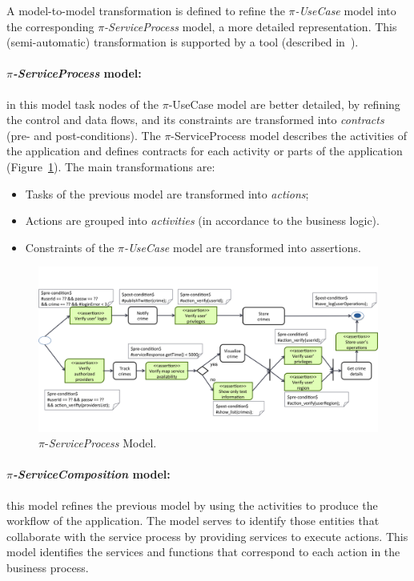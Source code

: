 \documentclass{llncs}
\theoremstyle{plain}
\theoremstyle{plain}
\theoremstyle{plain}
\begin{document}
A model-to-model transformation is defined to refine the \textit{$\pi$-UseCase} model into the
corresponding \textit{$\pi$-ServiceProcess} model, a more detailed representation. 
This (semi-automatic) transformation  is supported by a tool (described in~\cite{PlacidoThesis2012}).


\paragraph*{\textit{$\pi$-ServiceProcess} model:}
in this model task nodes of the $\pi$-UseCase model are better detailed, by refining the control and data flows, and its constraints are transformed into \textit{contracts} (pre- and post-conditions).
The $\pi$-ServiceProcess model describes the activities of the application and defines contracts for each activity or parts of the application (Figure~\ref{fig:piSP}). The main transformations are: 
\begin{itemize}
\item Tasks of the previous model are transformed into \textit{actions};
\item Actions are grouped into \textit{activities} (in accordance to the business logic).
\item Constraints of the \textit{$\pi$-UseCase} model are transformed into assertions.
\end{itemize}

\begin{figure}[t]
\centering
\includegraphics[width=1\textwidth]{piServiceProcess.png}
\caption{$\pi$-\textit{ServiceProcess} Model.}
\label{fig:piSP}
\end{figure}

\paragraph*{\textit{$\pi$-ServiceComposition} model:} 
this model refines the previous model by using the activities to produce the workflow of the application.
The model serves to identify those entities that collaborate with the service process by providing services to execute actions. 
This model identifies the services and functions that correspond to each action in the business process.
\end{document}
